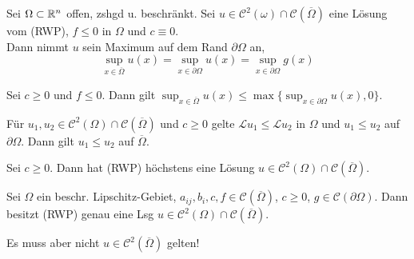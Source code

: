 \documentclass{cheat-sheet}
\newcommand{\Cont}{\mathcal{C}} %
\newcommand{\clos}[1]{\overline{#1}} %
\newcommand{\cOmega}{\clos{\Omega}} %
\newcommand{\bOmega}{\partial \Omega} %
\newcommand{\LL}{\mathcal{L}} %
\begin{document}
\begin{satz}
  Sei $\Omega \subset \mathbb{R}^n$ offen, zshgd u. beschränkt.
  Sei $u \in \Cont^2(\omega) \cap \Cont(\cOmega)$ eine Lösung vom (RWP), $f \leq 0$ in $\Omega$ und $c \equiv 0$. \\
  Dann nimmt $u$ sein Maximum auf dem Rand $\bOmega$ an, \dh{}
  \[ \sup_{x \in \cOmega} u(x) = \sup_{x \in \bOmega} u(x) = \sup_{x \in \bOmega} g(x) \]
\end{satz}


\begin{kor}
  Sei $c \geq 0$ und $f \leq 0$.
  Dann gilt
  $\sup_{x \in \cOmega} u(x) \leq \max \{ \sup_{x \in \bOmega} u(x), 0 \}$.
\end{kor}

\begin{kor}
  Für $u_1, u_2 \in \Cont^2(\Omega) \cap \Cont(\cOmega)$ und $c \geq 0$ gelte $\LL u_1 \leq \LL u_2$ in $\Omega$ und $u_1 \leq u_2$ auf $\bOmega$.
  Dann gilt $u_1 \leq u_2$ auf $\cOmega$.
\end{kor}

\begin{kor}[Eindeutigkeit]
  Sei $c \geq 0$. Dann hat (RWP) höchstens eine Lösung $u \in \Cont^2(\Omega) \cap \Cont(\cOmega)$.
\end{kor}

\iffalse
\begin{bsp}
  Betrachte $-u'' - \lambda u = 0$ in $\Omega = \ointerval{0}{1}$ mit $\lambda > 0$, $u(0) = u(1) = 0$.
  \begin{itemize}
    \item $u \equiv 0$ ist eine Lösung
    \item Für $\lambda = k^2 \pi^2$ ist $u(x) = a \sin(k \pi x)$ auch eine Lösung
  \end{itemize}
\end{bsp}
\fi

\begin{satz}
  Sei $\Omega$ ein beschr. Lipschitz-Gebiet, $a_{ij}, b_i, c, f \in \Cont(\cOmega)$, $c \geq 0$, $g \in \Cont(\bOmega)$.
  Dann besitzt (RWP) genau eine Lsg $u \in \Cont^2(\Omega) \cap \Cont(\cOmega)$.
\end{satz}


\begin{acht}
  Es muss aber nicht $u \in \Cont^2(\cOmega)$ gelten!
\end{acht}
\end{document}
